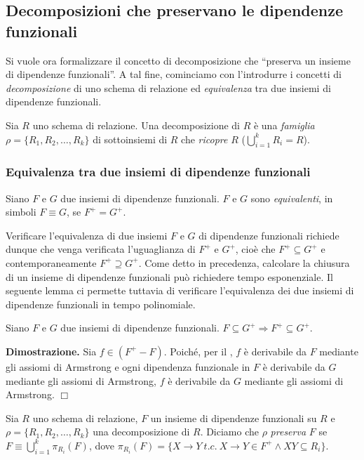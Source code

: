 \subsection{Decomposizioni che preservano le dipendenze funzionali}
Si vuole ora formalizzare il concetto di decomposizione che ``preserva un insieme di dipendenze funzionali''.
A tal fine, cominciamo con l'introdurre i concetti di \emph{decomposizione} di uno schema di relazione ed 
\emph{equivalenza} tra due insiemi di dipendenze funzionali.\\
\begin{defn}
Sia $R$ uno schema di relazione. Una decomposizione di $R$ è una \emph{famiglia} $\rho = \{R_1, R_2, \ldots, 
R_k\}$ di sottoinsiemi di $R$ che \emph{ricopre} $R$ ($\bigcup_{i=1}^k R_i = R$).
\end{defn}
\subsubsection{Equivalenza tra due insiemi di dipendenze funzionali}
\begin{defn}
Siano $F$ e $G$ due insiemi di dipendenze funzionali. $F$ e $G$ sono \emph{equivalenti}, in simboli $F \equiv 
G$, se $F^+ = G^+$.
\end{defn}
Verificare l'equivalenza di due insiemi $F$ e $G$ di dipendenze funzionali richiede dunque che venga verificata
l'uguaglianza di $F^+$ e $G^+$, cioè che $F^+ \subseteq G^+$ e contemporaneamente $F^+ \supseteq G^+$. Come 
detto in precedenza, calcolare la chiusura di un insieme di dipendenze funzionali può richiedere tempo 
esponenziale. Il seguente lemma ci permette tuttavia di verificare l'equivalenza dei due insiemi di dipendenze
funzionali in tempo polinomiale.
\label{lemma4_2}
\begin{lem}
Siano $F$ e $G$ due insiemi di dipendenze funzionali. $F \subseteq G^+ \Rightarrow F^+ \subseteq G^+$. 
\end{lem}
\textbf{Dimostrazione.} Sia $f \in (F^+ -F)$. Poiché, per il , $f$ è derivabile
da $F$ mediante gli assiomi di Armstrong e ogni dipendenza funzionale in $F$ è derivabile da $G$ mediante gli 
assiomi di Armstrong, $f$ è derivabile da $G$ mediante gli assiomi di Armstrong. \hfill $\Box$

\begin{defn}
Sia $R$ uno schema di relazione, $F$ un insieme di dipendenze funzionali su $R$ e $\rho = \{R_1, R_2, \ldots,
R_k\}$ una decomposizione di $R$. Diciamo che $\rho$ \emph{preserva} $F$ se $F \equiv \bigcup_{i=1}^k 
\pi_{R_i}(F)$, dove $\pi_{R_i}(F) = \{X \rightarrow Y\ t.c.\ X \rightarrow Y \in F^+ \wedge XY \subseteq R_i\}$.
\end{defn}
